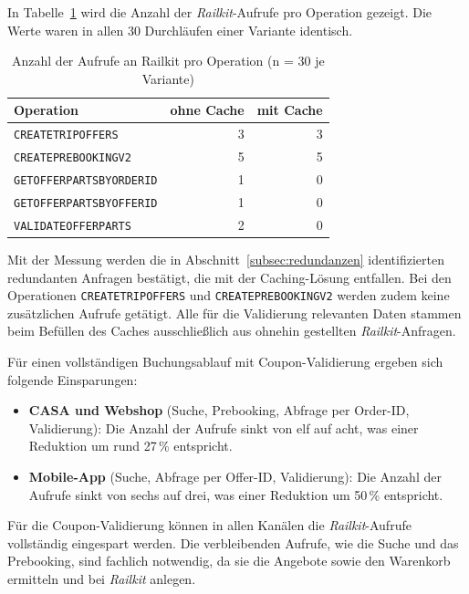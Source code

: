 In Tabelle~\ref{tab:ergebnis_anfragen} wird die Anzahl der \textit{Railkit}-Aufrufe pro Operation gezeigt. Die Werte waren in allen 30 Durchläufen einer Variante identisch.

\begin{table}[htbp]
    \centering
    \begin{tabular}{p{} r r}
        \hline
        \textbf{Operation} & \textbf{ohne Cache} & \textbf{mit Cache} \\
        \hline
        \texttt{CREATETRIPOFFERS} & 3 & 3 \\
        \texttt{CREATEPREBOOKINGV2} & 5 & 5 \\
        \texttt{GETOFFERPARTSBYORDERID} & 1 & 0 \\
        \texttt{GETOFFERPARTSBYOFFERID} & 1 & 0 \\
        \texttt{VALIDATEOFFERPARTS} & 2 & 0 \\
        \hline
    \end{tabular}
    \caption{Anzahl der Aufrufe an Railkit pro Operation (n = 30 je Variante)}
    \label{tab:ergebnis_anfragen}
\end{table}

Mit der Messung werden die in Abschnitt~\ref{subsec:redundanzen} identifizierten redundanten Anfragen bestätigt, die mit der Caching-Lösung entfallen. Bei den Operationen \texttt{CREATETRIPOFFERS} und \texttt{CREATEPREBOOKINGV2} werden zudem keine zusätzlichen Aufrufe getätigt. Alle für die Validierung relevanten Daten stammen beim Befüllen des Caches ausschließlich aus ohnehin gestellten \textit{Railkit}-Anfragen.

Für einen vollständigen Buchungsablauf mit Coupon-Validierung ergeben sich folgende Einsparungen:

\begin{itemize}
    \item \textbf{CASA und Webshop} (Suche, Prebooking, Abfrage per Order-ID, Validierung): Die Anzahl der Aufrufe sinkt von elf auf acht, was einer Reduktion um rund 27\,\% entspricht.
    \item \textbf{Mobile-App} (Suche, Abfrage per Offer-ID, Validierung): Die Anzahl der Aufrufe sinkt von sechs auf drei, was einer Reduktion um 50\,\% entspricht.
\end{itemize}

Für die Coupon-Validierung können in allen Kanälen die \textit{Railkit}-Aufrufe vollständig eingespart werden. Die verbleibenden Aufrufe, wie die Suche und das Prebooking, sind fachlich notwendig, da sie die Angebote sowie den Warenkorb ermitteln und bei \textit{Railkit} anlegen.

